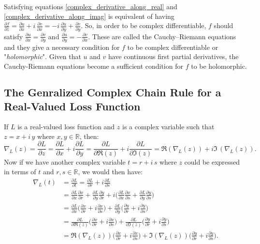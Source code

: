 \documentclass{article}
\begin{document}
Satisfying equations \ref{complex_derivative_along_real} and \ref{complex_derivative_along_imag} is equivalent of having $\frac{\partial f}{\partial z} = \frac{\partial u}{\partial x} + i \, \frac{\partial v}{\partial x} = -i \, \frac{\partial u}{\partial y} + \frac{\partial v}{\partial y}$. So, in order to be complex differentiable, $f$ should satisfy $\frac{\partial u}{\partial x} = \frac{\partial v}{\partial y}$ and $\frac{\partial u}{\partial y} = -\frac{\partial v}{\partial x}$. These are called the Cauchy–Riemann equations and they give a necessary condition for $f$ to be complex differentiable or "\textit{holomorphic}". Given that $u$ and $v$ have continuous first partial derivatives, the Cauchy-Riemann equations become a sufficient condition for $f$ to be holomorphic.

\subsection{The Genralized Complex Chain Rule for a Real-Valued Loss Function}\label{chainrule}
If $L$ is a real-valued loss function and $z$ is a complex variable such that $z = x + i \, y$ where $x, y \in \mathbb{R}$, then:
\begin{equation}\label{cost_derivative}
\nabla_{L}(z) = \frac{\partial L}{\partial z} = \frac{\partial L}{\partial x} + i \frac{\partial L}{\partial y} = \frac{\partial L}{\partial \Re(z)} + i \frac{\partial L}{\partial \Im(z)} = \Re(\nabla_{L}(z)) + i \Im \, (\nabla_{L}(z)).
\end{equation}
Now if we have another complex variable $t = r + i \, s$ where $z$ could be expressed in terms of $t$ and $r, s \in \mathbb{R}$, we would then have:
\begin{equation}\label{chain_derivative}
\begin{aligned}
\nabla_{L}(t) & = \frac{\partial L}{\partial t} = \frac{\partial L}{\partial r} + i \frac{\partial L}{\partial s} \\ & = \frac{\partial L}{\partial x} \frac{\partial x}{\partial r} + \frac{\partial L}{\partial y} \frac{\partial y}{\partial r} + i \bigg(\frac{\partial L}{\partial x}\frac{\partial x}{\partial s} + \frac{\partial L}{\partial y}\frac{\partial y}{\partial s}\bigg) \\ & = \frac{\partial L}{\partial x} \bigg(\frac{\partial x}{\partial r} + i \frac{\partial x}{\partial s}\bigg) + \frac{\partial L}{\partial y} \bigg(\frac{\partial y}{\partial r} + i \frac{\partial y}{\partial s}\bigg) \\ & = \frac{\partial L}{\partial \Re(z)} \bigg(\frac{\partial x}{\partial r} + i \frac{\partial x}{\partial s}\bigg) + \frac{\partial L}{\partial \Im(z)} \bigg(\frac{\partial y}{\partial r} + i \frac{\partial y}{\partial s}\bigg)\\ & = \Re(\nabla_{L}(z)) \bigg(\frac{\partial x}{\partial r} + i \frac{\partial x}{\partial s}\bigg) + \Im(\nabla_{L}(z)) \bigg(\frac{\partial y}{\partial r} + i \frac{\partial y}{\partial s}\bigg).
\end{aligned}
\end{equation}
\end{document}
